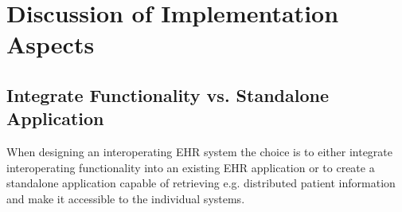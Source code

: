\documentclass[14pt]{article}
\begin{document}

\newpage

\section{Discussion of Implementation Aspects}%
\label{sec:Results}
\label{sec:resultsEndUser}

\subsection{Integrate Functionality vs. Standalone Application} %
When designing an interoperating EHR system the choice is to either integrate interoperating functionality into an existing EHR application or to create a standalone application capable of retrieving e.g. distributed patient information and make it accessible to the individual systems.
\end{document}
